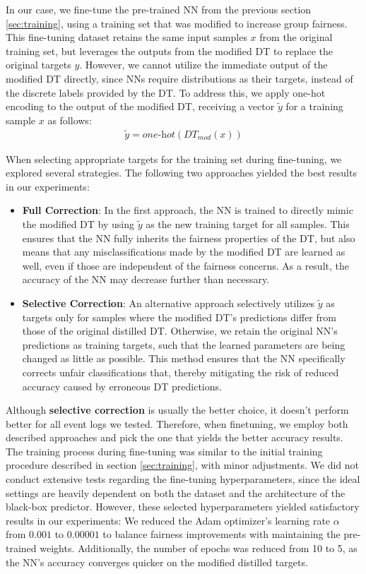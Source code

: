 In our case, we fine-tune the pre-trained NN from the previous section \ref{sec:training},
using a training set that was modified to increase group fairness.
This fine-tuning dataset retains the same input samples $x$ from the original training set,
but leverages the outputs from the modified DT to replace the original targets $y$.
However, we cannot utilize the immediate output of the modified DT directly, since NNs require distributions as their targets,
instead of the discrete labels provided by the DT.
To address this, we apply one-hot encoding to the output of the modified DT,
receiving a vector $\tilde{y}$ for a training sample $x$ as follows:
\begin{align}
    \tilde{y} = \textit{one-hot}(\textit{DT}_{mod}(x))
\end{align}

When selecting appropriate targets for the training set during fine-tuning,
we explored several strategies.
The following two approaches yielded the best results in our experiments:

\begin{itemize}  
    \item \textbf{Full Correction}:  
    In the first approach, the NN is trained to directly mimic the modified DT by using $\tilde{y}$ as the new training target for all samples.
    This ensures that the NN fully inherits the fairness properties of the DT, but also means that any misclassifications made by the modified DT are learned as well,
    even if those are independent of the fairness concerns.
    As a result, the accuracy of the NN may decrease further than necessary. 

    \item \textbf{Selective Correction}:  
    An alternative approach selectively utilizes $\tilde{y}$ as targets only for samples where the modified DT's predictions differ from those of the original distilled DT.
    Otherwise, we retain the original NN's predictions as training targets, such that the learned parameters are being changed as little as possible.
    This method ensures that the NN specifically corrects unfair classifications that, thereby mitigating the risk of reduced accuracy caused by erroneous DT predictions.
\end{itemize}  

Although \textbf{selective correction} is usually the better choice, it doesn't perform better for all event logs we tested.
Therefore, when finetuning, we employ both described approaches and pick the one that yields the better accuracy results.
The training process during fine-tuning was similar to the initial training procedure
described in section \ref{sec:training}, with minor adjustments.
We did not conduct extensive tests regarding the fine-tuning hyperparameters,
since the ideal settings are heavily dependent on both the 
dataset and the architecture of the black-box predictor.
However, these selected hyperparameters yielded satisfactory results in our experiments:
We reduced the Adam optimizer's learning rate $\alpha$ from $0.001$
to $0.00001$ to balance fairness improvements with maintaining the pre-trained weights.
Additionally, the number of epochs was reduced from 10 to 5,
as the NN's accuracy converges quicker on the modified distilled targets.


